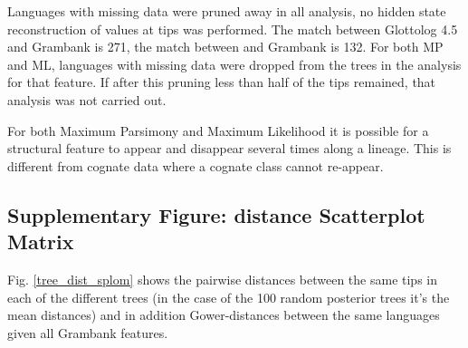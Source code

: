 \documentclass[12pt,letterpaper]{article}
\begin{document}

Languages with missing data were pruned away in all analysis, no hidden state reconstruction of values at tips was performed. The match between Glottolog 4.5 and Grambank is 271, the match between \citet{grayetal_2009} and Grambank is 132. For both MP and ML, languages with missing data were dropped from the trees in the analysis for that feature. If after this pruning less than half of the tips remained, that analysis was not carried out.

For both Maximum Parsimony and Maximum Likelihood it is possible for a structural feature to appear and disappear several times along a lineage. This is different from cognate data where a cognate class cannot re-appear.

\subsection{Supplementary Figure: distance Scatterplot Matrix}
Fig. \ref{tree_dist_splom} shows the pairwise distances between the same tips in each of the different trees (in the case of the 100 random posterior trees it's the mean distances) and in addition Gower-distances between the same languages given all Grambank features.
\end{document}

